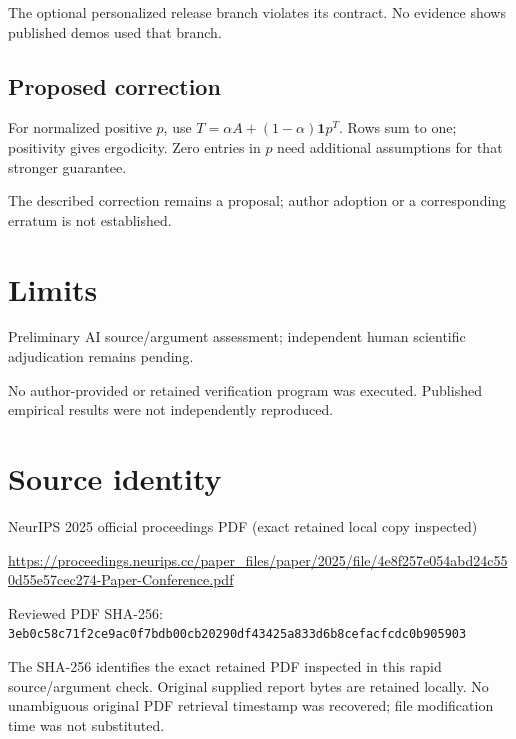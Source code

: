 \documentclass[11pt]{article}
\begin{document}
The optional personalized release branch violates its contract. No evidence shows published demos used that branch.

\subsection*{Proposed correction}

For normalized positive \(p\), use \(T=\alpha A+(1-\alpha)\mathbf1p^T\). Rows sum to one; positivity gives ergodicity. Zero entries in \(p\) need additional assumptions for that stronger guarantee.

The described correction remains a proposal; author adoption or a corresponding erratum is not established.

\section*{Limits}

Preliminary AI source/argument assessment; independent human scientific adjudication remains pending.\par

No author-provided or retained verification program was executed. Published empirical results were not independently reproduced.\par

\section*{Source identity}

NeurIPS 2025 official proceedings PDF (exact retained local copy inspected)

\url{https://proceedings.neurips.cc/paper_files/paper/2025/file/4e8f257e054abd24c550d55e57cec274-Paper-Conference.pdf}

Reviewed PDF SHA-256: \nolinkurl{3eb0c58c71f2ce9ac0f7bdb00cb20290df43425a833d6b8cefacfcdc0b905903}

The SHA-256 identifies the exact retained PDF inspected in this rapid source/argument check. Original supplied report bytes are retained locally. No unambiguous original PDF retrieval timestamp was recovered; file modification time was not substituted.
\end{document}
